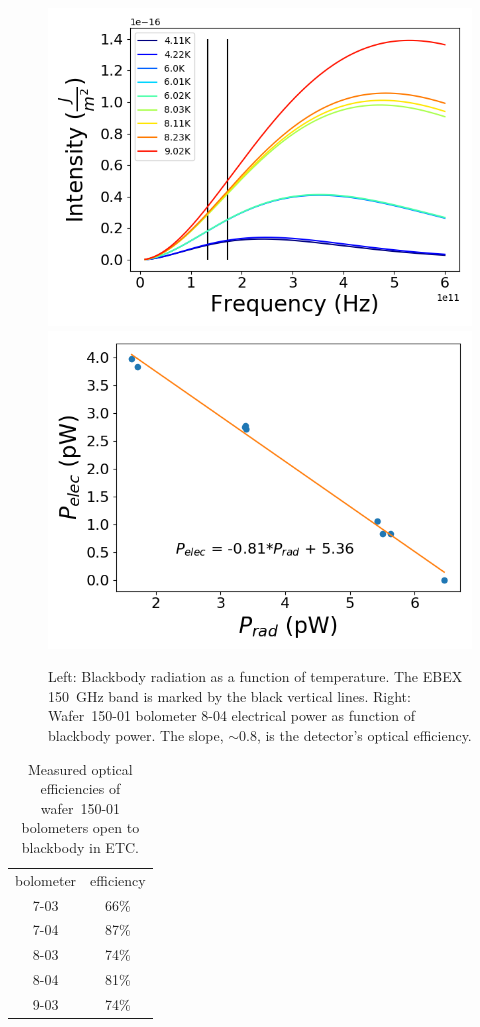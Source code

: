 \begin{figure}[htp]
\begin{center}
\includegraphics[width=0.49\columnwidth]{figures/blackbody_intensity_plot.png}
\includegraphics[width=0.48\columnwidth]{figures/SqCh2_Ch1_p_vs_p.png}
\caption{Left: Blackbody radiation as a function of temperature. The \ac{EBEX} 150~GHz band is marked by the black vertical lines. Right: Wafer~150-01 bolometer 8-04 electrical power as function of blackbody power. The slope, $\sim0.8$, is the detector's optical efficiency. 
\label{fig:pelec_vs_popt} }
\end{center}
\end{figure}

\begin{table}[htp]
\begin{center}
\begin{tabular}{|c|c|}
bolometer & efficiency \\
7-03	& 66\% \\
7-04	& 87\% \\
8-03	& 74\% \\
8-04	& 81\% \\
9-03	& 74\% \\
\end{tabular}
\end{center}
\caption{Measured optical efficiencies of wafer~150-01 bolometers open to blackbody in \ac{ETC}.
\label{tab:opt_eff} }
\end{table}

